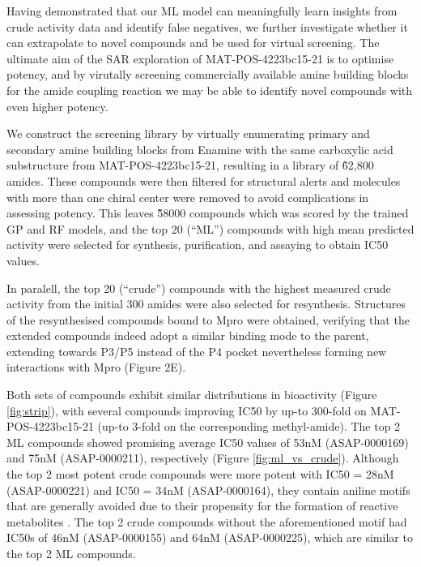 Having demonstrated that our ML model can meaningfully learn insights from crude activity data and identify false negatives, we further investigate whether it can extrapolate to novel compounds and be used for virtual screening. The ultimate aim of the SAR exploration of MAT-POS-4223bc15-21 is to optimise potency, and by virutally screening commercially available amine building blocks for the amide coupling reaction we may be able to identify novel compounds with even higher potency.

We construct the screening library by virtually enumerating primary and secondary amine building blocks from Enamine with the same carboxylic acid substructure from MAT-POS-4223bc15-21, resulting in a library of \~62,800 amides. These compounds were then filtered for structural alerts and molecules with more than one chiral center were removed to avoid complications in assessing potency. This leaves \~58000 compounds which was scored by the trained GP and RF models, and the top 20 (``ML'') compounds with high mean predicted activity were selected for synthesis, purification, and assaying to obtain IC50 values.


In paralell, the top 20 (``crude'') compounds with the highest measured crude activity from the initial 300 amides were also selected for resynthesis. Structures of the resynthesised compounds bound to Mpro were obtained, verifying that the extended compounds indeed adopt a similar binding mode to the parent, extending towards P3/P5 instead of the P4 pocket nevertheless forming new interactions with Mpro (Figure 2E).

Both sets of compounds exhibit similar distributions in bioactivity (Figure \ref{fig:strip}), with several compounds improving IC50 by up-to 300-fold on MAT-POS-4223bc15-21 (up-to 3-fold on the corresponding methyl-amide). The top 2 ML compounds showed promising average IC50 values of 53nM (ASAP-0000169) and 75nM (ASAP-0000211), respectively (Figure \ref{fig:ml_vs_crude}). Although the top 2 most potent crude compounds were  more potent with IC50 = 28nM (ASAP-0000221) and IC50 = 34nM (ASAP-0000164), they contain aniline motifs that are generally avoided due to their propensity for the formation of reactive metabolites \cite{Stepan2011aniline}. The top 2 crude compounds without the aforementioned motif had IC50s of 46nM (ASAP-0000155) and 64nM (ASAP-0000225), which are similar to the top 2 ML compounds.

